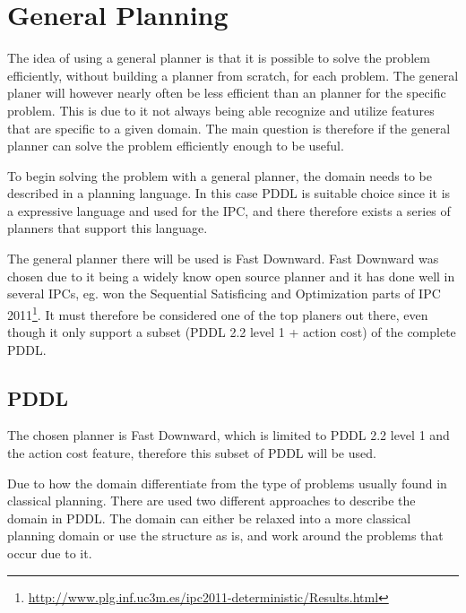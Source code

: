 \chapter{General Planning}
	The idea of using a general planner is that it is possible to solve the problem efficiently, without building a planner from scratch, for each problem. The general planer will however nearly often be less efficient than an planner for the specific problem. This is due to it not always being able recognize and utilize features that are specific to a given domain. The main question is therefore if the general planner can solve the problem efficiently enough to be useful.

	To begin solving the problem with a general planner, the domain needs to be described in a planning language. In this case PDDL is suitable choice since it is a expressive language and used for the IPC, and there therefore exists a series of planners that support this language.
 
	  
	The general planner there will be used is Fast Downward. Fast Downward was chosen due to it being a widely know open source planner and it has done well in several IPCs, eg. won the Sequential Satisficing and Optimization parts of IPC 2011\footnote{\url{http://www.plg.inf.uc3m.es/ipc2011-deterministic/Results.html}}. It must therefore be considered one of the top planers out there, even though it only support a subset (PDDL 2.2 level 1 + action cost) of the complete PDDL.
 
 \section{PDDL}
	The chosen planner is Fast Downward, which is limited to PDDL 2.2 level 1 and the action cost feature, therefore this subset of PDDL will be used.

	Due to how the domain differentiate from the type of problems usually found in classical planning. There are used two different approaches to describe the domain in PDDL. The domain can either be relaxed into a more classical planning domain or use the structure as is, and work around the problems that occur due to it.
	

